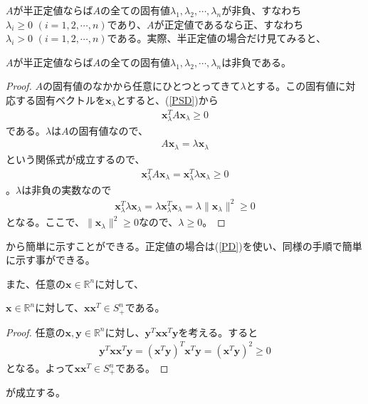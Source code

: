$A$が半正定値ならば$A$の全ての固有値$\lambda_1, \lambda_2, \cdots, \lambda_n$が非負、すなわち$\lambda_i \geq 0 \,\, (i = 1, 2, \cdots, n)$であり、$A$が正定値であるなら正、すなわち$\lambda_i > 0 \,\, (i = 1, 2, \cdots, n)$である。実際、半正定値の場合だけ見てみると、
\begin{theorem*}
  $A$が半正定値ならば$A$の全ての固有値$\lambda_1, \lambda_2, \cdots, \lambda_n$は非負である。
\end{theorem*}
\begin{proof}
  $A$の固有値のなかから任意にひとつとってきて$\lambda$とする。この固有値に対応する固有ベクトルを$\mathbf{x}_\lambda$とすると、(\ref{PSD})から
  \begin{align*}
    \mathbf{x}_\lambda^T A \mathbf{x}_\lambda \geq 0
  \end{align*}
  である。$\lambda$は$A$の固有値なので、
  \begin{align*}
    A \mathbf{x}_\lambda = \lambda \mathbf{x}_\lambda
  \end{align*}
  という関係式が成立するので、
  \begin{align*}
    \mathbf{x}_\lambda^T A \mathbf{x}_\lambda = \mathbf{x}_\lambda^T \lambda \mathbf{x}_\lambda \geq 0
  \end{align*}
  。$\lambda$は非負の実数なので
  \begin{align*}
    \mathbf{x}_\lambda^T \lambda \mathbf{x}_\lambda = \lambda \mathbf{x}_\lambda^T \mathbf{x}_\lambda = \lambda \|\mathbf{x}_\lambda\|^2 \geq 0
  \end{align*}
  となる。ここで、$\|\mathbf{x}_\lambda\|^2 \geq 0$なので、$\lambda \geq 0$。
\end{proof}
から簡単に示すことができる。正定値の場合は(\ref{PD})を使い、同様の手順で簡単に示す事ができる。

また、任意の$\mathbf{x} \in \mathbb{R}^n$に対して、
\begin{theorem} \label{PsdMatrix}
  $\mathbf{x} \in \mathbb{R}^n$に対して、$\mathbf{x} \mathbf{x}^T \in S_+^n$である。
\end{theorem}
\begin{proof}
  任意の$\mathbf{x}, \mathbf{y} \in \mathbb{R}^n$に対し、$\mathbf{y}^T \mathbf{x} \mathbf{x}^T \mathbf{y}$を考える。すると
  \begin{align*}
    \mathbf{y}^T \mathbf{x} \mathbf{x}^T \mathbf{y} = (\mathbf{x}^T \mathbf{y})^T \mathbf{x}^T \mathbf{y} = \left(\mathbf{x}^T \mathbf{y}\right)^2 \geq 0
  \end{align*}
  となる。よって$\mathbf{x} \mathbf{x}^T \in S_+^n$である。
\end{proof}
が成立する。
